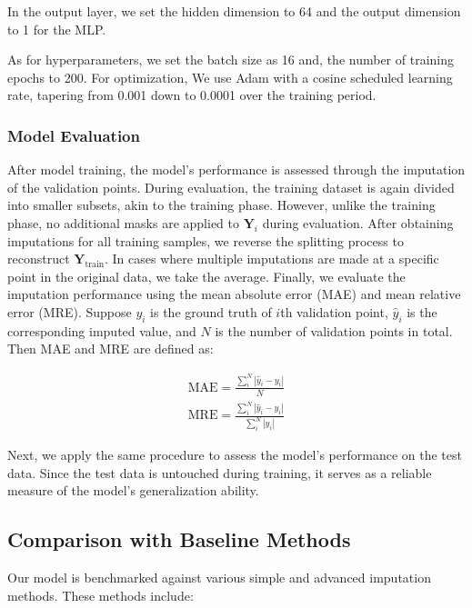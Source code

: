\documentclass[11pt]{article}
\begin{document}
In the output layer, we set the hidden dimension to 64 and the output dimension to 1 for the MLP. 

As for hyperparameters, we set the batch size as 16 and, the number of training epochs to 200. For optimization, We use Adam \citep{kingma2014adam} with a cosine scheduled learning rate, tapering from 0.001 down to 0.0001 over the training period.


\subsubsection*{Model Evaluation}
After model training, the model's performance is assessed through the imputation of the validation points. During evaluation, the training dataset is again divided into smaller subsets, akin to the training phase. However, unlike the training phase, no additional masks are applied to $\boldsymbol{Y}_i$ during evaluation. After obtaining imputations for all training samples, we reverse the splitting process to reconstruct $\boldsymbol{Y}_{\text{train}}$. In cases where multiple imputations are made at a specific point in the original data, we take the average. Finally, we evaluate the imputation performance using the mean absolute error (MAE) and mean relative error (MRE). Suppose $y_i$ is the ground truth of $i$th validation point, $\hat{y}_i$ is the corresponding imputed value, and $N$ is the number of validation points in total. Then MAE and MRE are defined as:


\begin{align}
		\text{MAE}=\frac{\sum_i^N |\hat{y}_i - y_i|}{N}\\
		\text{MRE}=\frac{\sum_i^N|\hat{y}_i-y_i|}{\sum_i^N|y_i|}
\end{align}


Next, we apply the same procedure to assess the model's performance on the test data. Since the test data is untouched during training, it serves as a reliable measure of the model's generalization ability.



\subsection{Comparison with Baseline Methods}
Our model is benchmarked against various simple and advanced imputation methods. These methods include:
\end{document}
